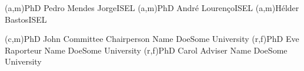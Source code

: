 

\ncmember(a,m){PhD Pedro Mendes Jorge}{ISEL}
\ncmember(a,m){PhD André Lourenço}{ISEL}
\ncmember(a,m){Hélder Bastos}{ISEL}

\ncmember(c,m){PhD John Committee Chairperson Name Doe}{Some University}
\ncmember(r,f){PhD Eve Raporteur Name Doe}{Some University}
\ncmember(r,f){PhD Carol Adviser Name Doe}{Some University}

